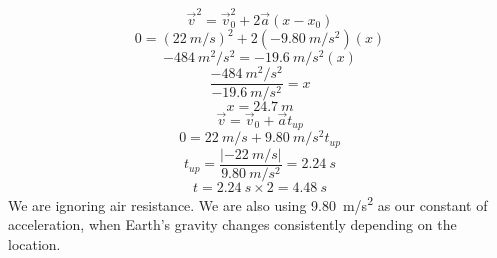 \documentclass[11pt]{homework}
\begin{document}
\question
  \begin{alphaparts}
    \questionpart
      \[
        \vec v^2 = \vec v_0^2 + 2\vec a(x-x_0) 
      \]
      \[
        0 = (\qty{22}{m/s})^2 + 2(\qty{-9.80}{m/s^2})(x) 
      \]
      \[
       \qty{-484}{m^2/s^2} = \qty{-19.6}{m/s^2}(x) 
      \]
      \[
        \frac{\qty{-484}{m^2/s^2}}{\qty{-19.6}{m/s^2}} = x 
      \]
      \[
        x = \boxed{\qty{24.7}{m}}
      \]
    \questionpart
      \[
        \vec v = \vec v_0 + \vec at_{up}
      \]
      \[
        0 = \qty{22}{m/s} + \qty{9.80}{m/s^2}t_{up}
      \]
      \[
        t_{up} = \frac{|\qty{-22}{m/s}|}{\qty{9.80}{m/s^2}} = \qty{2.24}{s}
      \]
      \[
        t = \qty{2.24}{s} \times 2 = \boxed{\qty{4.48}{s}}
      \]
    \questionpart
      We are ignoring air resistance. We are also using \qty{9.80}{m/s^2} as our constant of acceleration, when Earth's gravity changes consistently depending on the location. 
  \end{alphaparts}
\end{document}
